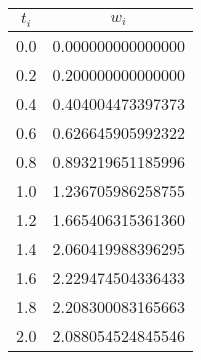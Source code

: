 \documentclass{homework}
\begin{document}
\newpage
\begin{table}[h]
    \centering
    \begin{tabular}{cc}
        $t_i$ & $w_i$             \\ \hline
        0.0   & 0.000000000000000 \\
        0.2   & 0.200000000000000 \\
        0.4   & 0.404004473397373 \\
        0.6   & 0.626645905992322 \\
        0.8   & 0.893219651185996 \\
        1.0   & 1.236705986258755 \\
        1.2   & 1.665406315361360 \\
        1.4   & 2.060419988396295 \\
        1.6   & 2.229474504336433 \\
        1.8   & 2.208300083165663 \\
        2.0   & 2.088054524845546
    \end{tabular}
\end{table}

\vskip1cm
\end{document}
